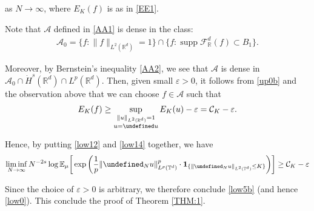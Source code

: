 \documentclass[letterpaper, 11pt,  reqno]{amsart}
\DeclareMathOperator*{\supp}{supp}
\newcommand{\noi}{\noindent}
\newcommand{\R}{\mathbb{R}}
\newcommand{\T}{\mathbb{T}}
\let\P= \undefined
\newcommand{\P}{\mathbf{P}}
\newcommand{\E}{\mathbb{E}}
\newcommand{\F}{\mathcal{F}}
\newcommand{\eps}{\varepsilon}
\newcommand{\ind}{\mathbf 1}
\numberwithin{equation}{section}
\numberwithin{theorem}{section}
\newcommand{\CC}{\mathcal{C}}
\begin{document}
\noi
as $N \to \infty$, 
where $E_K(f)$ is as in \eqref{EE1}.






Note that $\mathcal{A}$ defined in \eqref{AA1} 
is dense in the class:
\begin{align}
 \mathcal{A}_0 = \{ f: \|f\|_{L^2(\R^d)} = 1\}\cap 
 \{f : \supp \F_\R^d(f) \subset B_1\}.
\label{low13}
\end{align}


\noi
Moreover, 
by Bernstein's inequality \eqref{AA2}, 
we see
that $\mathcal{A}$ is dense in 
$\mathcal{A}_0 \cap \dot H^s(\R^d)\cap L^p(\R^d)$.
Then, given 
small $\eps > 0$, 
it follows from \eqref{up0b}
and the observation above that 
we can choose $f \in \mathcal{A}$
such that 
\begin{align}
E_K(f)
\ge  \sup_{\substack{\|u\|_{L^2(\R^d)} = 1\\ 
u = \P u}} E_K(u) - \eps 
= \CC_K - \eps.
\label{low14}
\end{align}

\noi
Hence, by putting 
\eqref{low12}
and \eqref{low14} together, we have
\begin{align*}
\liminf_{N\to \infty}
N^{-2s} 
\log \E_{\mu}\bigg[ 
\exp\bigg( \frac 1 p \| \P_N u\|^p_{L^p(\T^d)} \cdot 
 \ind_{\{ \| \P_{N} u \|_{L^2 (\mathbb{T}^d)}\leq K \}}\bigg)\bigg] \ge \CC_K-\eps
\end{align*}

\noi
Since the choice of $\eps > 0$ 
is arbitrary, 
we therefore conclude 
\eqref{low5b} (and hence \eqref{low0}).
This conclude the proof of Theorem \ref{THM:1}.
\end{document}
